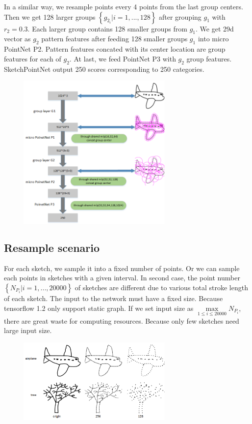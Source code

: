 In a similar way, we resample points every 4 points from the last group centers. Then we get 128 larger groups $\left\{ g_{2_i}| i = 1, ..., 128 \right\}$ after grouping $g_1$ with $r_2 = 0.3$. Each larger group contains 128 smaller groups from $g_1$. We get 29d vector as $g_2$ pattern features after feeding 128 smaller groups $g_1$ into micro PointNet P2. Pattern features concated with its center location are group features for each of $g_2$. At last, we feed PointNet P3 with $g_2$ group features. SketchPointNet output 250 scores corresponding to 250 categories.

\begin{figure}
    \center
    \includegraphics[width=3in]{images/sketchpointnet.png}
    \label{fig:sketchpointnet}
\end{figure}


\subsection{Resample scenario}
\label{ssec:resample_scenario}

For each sketch, we sample it into a fixed number of points. Or we can sample each points in sketches with a given interval. In second case, the point number $\left\{ N_{P_i}| i = 1, ..., 20000 \right\}$ of sketches are different due to various total stroke length of each sketch. The input to the network must have a fixed size. Because tensorflow 1.2 only support static graph. If we set input size as $\max \limits_{1 \le i \le 20000} N_{P_i}$, there are great waste for computing resources. Because only few sketches need large input size.

\begin{figure}
    \center
    \includegraphics[width=3in]{images/resample2.png}
    \label{fig:resample}
\end{figure}

